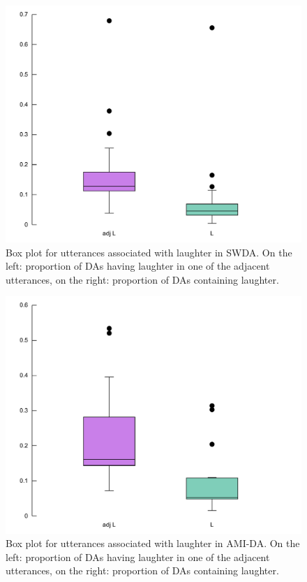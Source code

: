\documentclass[11pt,a4paper]{article}
\begin{document}
\begin{figure}
  \centering
  \includegraphics[width=\the\columnwidth]{img/box-swda.pdf}
  \caption{Box plot for utterances associated with laughter in SWDA. On the left: proportion of DAs having laughter in one of the adjacent utterances, on the right: proportion of DAs containing laughter. }
    \label{fig:box-swda}
\end{figure}

\begin{figure}
  \centering
  \includegraphics[width=\the\columnwidth]{img/box-ami.pdf}
  \caption{Box plot for utterances associated with laughter in AMI-DA. On the left: proportion of DAs having laughter in one of the adjacent utterances, on the right: proportion of DAs containing laughter. }
    \label{fig:box-ami}
\end{figure}
\end{document}
